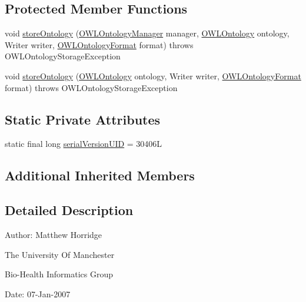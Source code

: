\subsection*{Protected Member Functions}
\begin{DoxyCompactItemize}
\item 
void \hyperlink{classorg_1_1coode_1_1owlapi_1_1owlxml_1_1renderer_1_1_o_w_l_x_m_l_ontology_storer_aab7fa000410ef89385c05012e36f05d5}{store\-Ontology} (\hyperlink{interfaceorg_1_1semanticweb_1_1owlapi_1_1model_1_1_o_w_l_ontology_manager}{O\-W\-L\-Ontology\-Manager} manager, \hyperlink{interfaceorg_1_1semanticweb_1_1owlapi_1_1model_1_1_o_w_l_ontology}{O\-W\-L\-Ontology} ontology, Writer writer, \hyperlink{classorg_1_1semanticweb_1_1owlapi_1_1model_1_1_o_w_l_ontology_format}{O\-W\-L\-Ontology\-Format} format)  throws O\-W\-L\-Ontology\-Storage\-Exception 
\item 
void \hyperlink{classorg_1_1coode_1_1owlapi_1_1owlxml_1_1renderer_1_1_o_w_l_x_m_l_ontology_storer_af2cc7c5cef2aa2e10e430bb991266ac3}{store\-Ontology} (\hyperlink{interfaceorg_1_1semanticweb_1_1owlapi_1_1model_1_1_o_w_l_ontology}{O\-W\-L\-Ontology} ontology, Writer writer, \hyperlink{classorg_1_1semanticweb_1_1owlapi_1_1model_1_1_o_w_l_ontology_format}{O\-W\-L\-Ontology\-Format} format)  throws O\-W\-L\-Ontology\-Storage\-Exception 
\end{DoxyCompactItemize}
\subsection*{Static Private Attributes}
\begin{DoxyCompactItemize}
\item 
static final long \hyperlink{classorg_1_1coode_1_1owlapi_1_1owlxml_1_1renderer_1_1_o_w_l_x_m_l_ontology_storer_aa647a564803e82a9fd370428334945c0}{serial\-Version\-U\-I\-D} = 30406\-L
\end{DoxyCompactItemize}
\subsection*{Additional Inherited Members}


\subsection{Detailed Description}
Author\-: Matthew Horridge\par
 The University Of Manchester\par
 Bio-\/\-Health Informatics Group\par
 Date\-: 07-\/\-Jan-\/2007\par
\par
 

